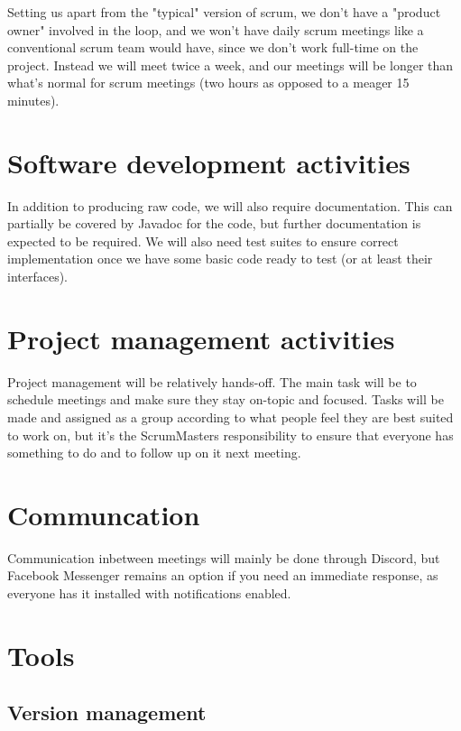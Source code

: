 \documentclass{article}
\begin{document}
Setting us apart from the "typical" version of scrum, we don't have a "product owner" involved in the loop, and we won't have daily scrum meetings like a conventional scrum team would have, since we don't work full-time on the project. Instead we will meet twice a week, and our meetings will be longer than what's normal for scrum meetings (two hours as opposed to a meager 15 minutes).

\section*{Software development activities}

In addition to producing raw code, we will also require documentation. This can partially be covered by Javadoc for the code, but further documentation is expected to be required. We will also need test suites to ensure correct implementation once we have some basic code ready to test (or at least their interfaces).

\section*{Project management activities}

Project management will be relatively hands-off. The main task will be to schedule meetings and make sure they stay on-topic and focused. Tasks will be made and assigned as a group according to what people feel they are best suited to work on, but it's the ScrumMasters responsibility to ensure that everyone has something to do and to follow up on it next meeting.

\section*{Communcation}

Communication inbetween meetings will mainly be done through Discord, but Facebook Messenger remains an option if you need an immediate response, as everyone has it installed with notifications enabled. 

\section*{Tools}

\subsection*{Version management}
\end{document}
